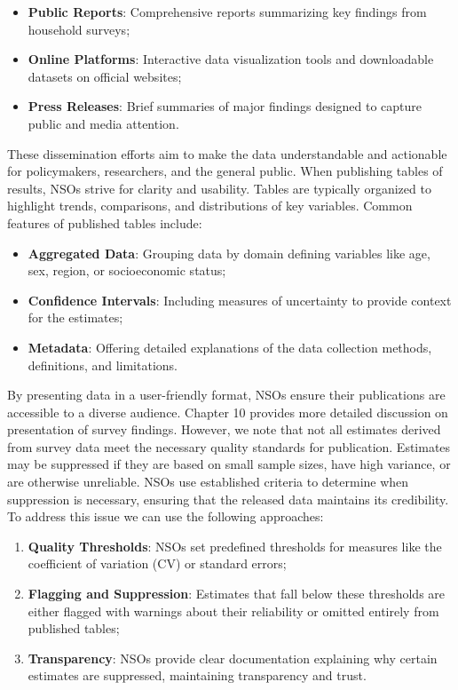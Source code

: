 \documentclass[
  12pt,
]{book}
\begin{document}
\begin{itemize}
\item
  \textbf{Public Reports}: Comprehensive reports summarizing key findings from household surveys;
\item
  \textbf{Online Platforms}: Interactive data visualization tools and downloadable datasets on official websites;
\item
  \textbf{Press Releases}: Brief summaries of major findings designed to capture public and media attention.
\end{itemize}

These dissemination efforts aim to make the data understandable and actionable for policymakers, researchers, and the general public. When publishing tables of results, NSOs strive for clarity and usability. Tables are typically organized to highlight trends, comparisons, and distributions of key variables. Common features of published tables include:

\begin{itemize}
\item
  \textbf{Aggregated Data}: Grouping data by domain defining variables like age, sex, region, or socioeconomic status;
\item
  \textbf{Confidence Intervals}: Including measures of uncertainty to provide context for the estimates;
\item
  \textbf{Metadata}: Offering detailed explanations of the data collection methods, definitions, and limitations.
\end{itemize}

By presenting data in a user-friendly format, NSOs ensure their publications are accessible to a diverse audience. Chapter 10 provides more detailed discussion on presentation of survey findings. However, we note that not all estimates derived from survey data meet the necessary quality standards for publication. Estimates may be suppressed if they are based on small sample sizes, have high variance, or are otherwise unreliable. NSOs use established criteria to determine when suppression is necessary, ensuring that the released data maintains its credibility. To address this issue we can use the following approaches:

\begin{enumerate}
\def\labelenumi{\arabic{enumi}.}
\item
  \textbf{Quality Thresholds}: NSOs set predefined thresholds for measures like the coefficient of variation (CV) or standard errors;
\item
  \textbf{Flagging and Suppression}: Estimates that fall below these thresholds are either flagged with warnings about their reliability or omitted entirely from published tables;
\item
  \textbf{Transparency}: NSOs provide clear documentation explaining why certain estimates are suppressed, maintaining transparency and trust.
\end{enumerate}
\end{document}
